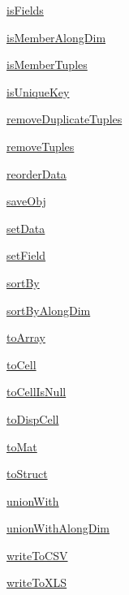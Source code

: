 \begin{list}{}{}
 \item \hyperref[method:smartdb.relations.ATypifiedStaticRelation.isFields]{isFields}
 \item \hyperref[method:smartdb.relations.ATypifiedStaticRelation.isMemberAlongDim]{isMemberAlongDim}
 \item \hyperref[method:smartdb.relations.ATypifiedStaticRelation.isMemberTuples]{isMemberTuples}
 \item \hyperref[method:smartdb.relations.ATypifiedStaticRelation.isUniqueKey]{isUniqueKey}
 \item \hyperref[method:smartdb.relations.ATypifiedStaticRelation.removeDuplicateTuples]{removeDuplicateTuples}
 \item \hyperref[method:smartdb.relations.ATypifiedStaticRelation.removeTuples]{removeTuples}
 \item \hyperref[method:smartdb.relations.ATypifiedStaticRelation.reorderData]{reorderData}
 \item \hyperref[method:smartdb.relations.ATypifiedStaticRelation.saveObj]{saveObj}
 \item \hyperref[method:smartdb.relations.ATypifiedStaticRelation.setData]{setData}
 \item \hyperref[method:smartdb.relations.ATypifiedStaticRelation.setField]{setField}
 \item \hyperref[method:smartdb.relations.ATypifiedStaticRelation.sortBy]{sortBy}
 \item \hyperref[method:smartdb.relations.ATypifiedStaticRelation.sortByAlongDim]{sortByAlongDim}
 \item \hyperref[method:smartdb.relations.ATypifiedStaticRelation.toArray]{toArray}
 \item \hyperref[method:smartdb.relations.ATypifiedStaticRelation.toCell]{toCell}
 \item \hyperref[method:smartdb.relations.ATypifiedStaticRelation.toCellIsNull]{toCellIsNull}
 \item \hyperref[method:smartdb.relations.ATypifiedStaticRelation.toDispCell]{toDispCell}
 \item \hyperref[method:smartdb.relations.ATypifiedStaticRelation.toMat]{toMat}
 \item \hyperref[method:smartdb.relations.ATypifiedStaticRelation.toStruct]{toStruct}
 \item \hyperref[method:smartdb.relations.ATypifiedStaticRelation.unionWith]{unionWith}
 \item \hyperref[method:smartdb.relations.ATypifiedStaticRelation.unionWithAlongDim]{unionWithAlongDim}
 \item \hyperref[method:smartdb.relations.ATypifiedStaticRelation.writeToCSV]{writeToCSV}
 \item \hyperref[method:smartdb.relations.ATypifiedStaticRelation.writeToXLS]{writeToXLS}
\end{list}

